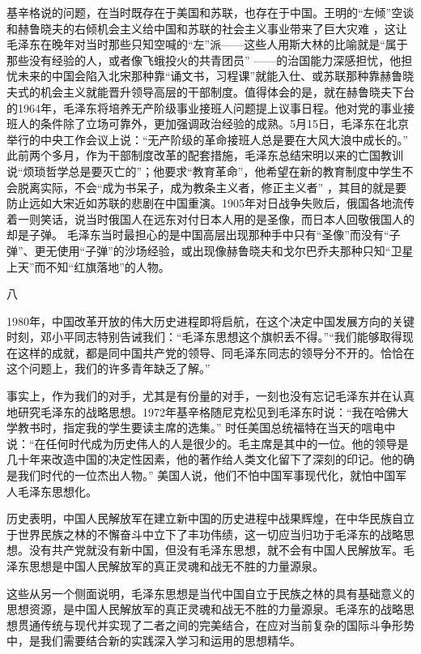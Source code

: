 \documentclass[UTF8, 12pt, a4paper]{ctexrep}
\begin{document}
基辛格说的问题，在当时既存在于美国和苏联，也存在于中国。王明的“左倾”空谈和赫鲁晓夫的右倾机会主义给中国和苏联的社会主义事业带来了巨大灾难 ，这让毛泽东在晚年对当时那些只知空喊的“左”派——这些人用斯大林的比喻就是“属于那些没有经验的人，或者像飞蛾投火的共青团员” ——的治国能力深感担忧，他担忧未来的中国会陷入北宋那种靠“诵文书，习程课”就能入仕、或苏联那种靠赫鲁晓夫式的机会主义就能晋升领导高层的干部制度。值得体会的是，就在赫鲁晓夫下台的1964年，毛泽东将培养无产阶级事业接班人问题提上议事日程。他对党的事业接班人的条件除了立场可靠外，更加强调政治经验的成熟。5月15日，毛泽东在北京举行的中央工作会议上说：“无产阶级的革命接班人总是要在大风大浪中成长的。” 此前两个多月，作为干部制度改革的配套措施，毛泽东总结宋明以来的亡国教训说“烦琐哲学总是要灭亡的”；他要求“教育革命”，他希望在新的教育制度中学生不会脱离实际，不会“成为书呆子，成为教条主义者，修正主义者” ，其目的就是要防止远如大宋近如苏联的悲剧在中国重演。1905年对日战争失败后，俄国各地流传着一则笑话，说当时俄国人在远东对付日本人用的是圣像，而日本人回敬俄国人的却是子弹。 毛泽东当时最担心的是中国高层出现那种手中只有“圣像”而没有“子弹”、更无使用“子弹”的沙场经验，或出现像赫鲁晓夫和戈尔巴乔夫那种只知“卫星上天”而不知“红旗落地”的人物。

八

1980年，中国改革开放的伟大历史进程即将启航，在这个决定中国发展方向的关键时刻，邓小平同志特别告诫我们：“毛泽东思想这个旗帜丢不得。”“我们能够取得现在这样的成就，都是同中国共产党的领导、同毛泽东同志的领导分不开的。恰恰在这个问题上，我们的许多青年缺乏了解。”

事实上，作为我们的对手，尤其是有份量的对手，一刻也没有忘记毛泽东并在认真地研究毛泽东的战略思想。1972年基辛格随尼克松见到毛泽东时说：“我在哈佛大学教书时，指定我的学生要读主席的选集。” 时任美国总统福特在当天的唁电中说：“在任何时代成为历史伟人的人是很少的。毛主席是其中的一位。他的领导是几十年来改造中国的决定性因素，他的著作给人类文化留下了深刻的印记。他的确是我们时代的一位杰出人物。” 美国人说，他们不怕中国军事现代化，就怕中国军人毛泽东思想化。

历史表明，中国人民解放军在建立新中国的历史进程中战果辉煌，在中华民族自立于世界民族之林的不懈奋斗中立下了丰功伟绩，这一切应当归功于毛泽东的战略思想。没有共产党就没有新中国，但没有毛泽东思想，就不会有中国人民解放军。毛泽东思想是中国人民解放军的真正灵魂和战无不胜的力量源泉。

这些从另一个侧面说明，毛泽东思想是当代中国自立于民族之林的具有基础意义的思想资源，是中国人民解放军的真正灵魂和战无不胜的力量源泉。毛泽东的战略思想贯通传统与现代并实现了二者之间的完美结合，在应对当前复杂的国际斗争形势中，是我们需要结合新的实践深入学习和运用的思想精华。
\end{document}
